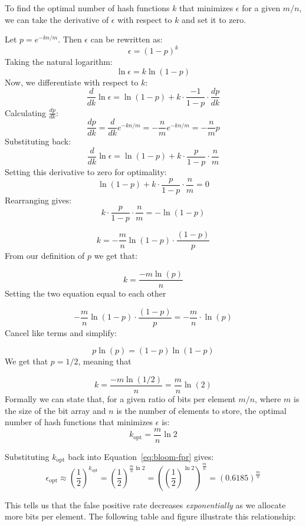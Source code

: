 To find the optimal number of hash functions $k$ that minimizes $\epsilon$ for a given $m/n$, we can take the derivative of $\epsilon$ with respect to $k$ and set it to zero.

Let $p = e^{-kn/m}$. Then $\epsilon$ can be rewritten as:
\[
  \epsilon = (1 - p)^k
\]
Taking the natural logarithm:
\[
    \ln \epsilon = k \ln(1 - p)
\]
Now, we differentiate with respect to $k$:
\[
    \frac{d}{dk} \ln \epsilon = \ln(1 - p
) + k \cdot \frac{-1}{1 - p} \cdot \frac{dp}{dk}
\]
Calculating $\frac{dp}{dk}$:
\[
    \frac{dp}{dk} = \frac{d}{dk} e^{-kn/m} = -\frac{n}{m} e^{-kn/m} = -\frac{n}{m} p
\]
Substituting back:
\[
    \frac{d}{dk} \ln \epsilon = \ln(1 - p) + k \cdot \frac{p}{1 - p} \cdot \frac{n}{m}
\]  Setting this derivative to zero for optimality:
\[
    \ln(1 - p) + k \cdot \frac{p}{1 - p} \cdot \frac{n}{m} = 0
\]  
Rearranging gives:
\[    k \cdot \frac{p}{1 - p} \cdot \frac{n}{m} = -\ln(1 - p) \]  


\[
    k = -\frac{m}{n}\ln(1-p) \cdot \frac{(1-p)}{p}
\]
From our definition of $p$ we get that:

\[
 k = \frac{-m\ln(p)}{n}
\]
Setting the two equation equal to each other

\[
 -\frac{m}{n}\ln(1-p) \cdot \frac{(1-p)}{p} = -\frac{m}n \cdot \ln(p)
\]
Cancel like terms and simplify:

\[
p\ln(p)  = (1-p)\ln(1-p)
\]
We get that $p = 1/2$, meaning that 

\[
 k = \frac{-m\ln(1/2)}{n} = \frac{m}{n}\ln(2)
\]
Formally we can state that, for a given ratio of bits per element $m/n$, where $m$ is the size of the bit array and $n$ is the number of 
elements to store, the optimal number of hash functions that minimizes 
$\epsilon$ is:
\begin{equation}
  k_{\text{opt}} = \frac{m}{n} \ln 2
  \label{eq:bloom-optimal-k}
\end{equation}

Substituting $k_{\text{opt}}$ back into Equation~\ref{eq:bloom-fpr} gives:
\begin{equation}
  \epsilon_{\text{opt}} \approx \left(\frac{1}{2}\right)^{k_{\text{opt}}} 
  = \left(\frac{1}{2}\right)^{\frac{m}{n} \ln 2} =  \left(\left(\frac{1}{2}\right)^{\ln 2}\right)^{\frac{m}{n}} = (0.6185)^{\frac{m}{n}}
  \label{eq:bloom-fpr-optimal}
\end{equation}

This tells us that the false positive rate decreases \emph{exponentially} 
as we allocate more bits per element. The following table and figure 
illustrate this relationship:

